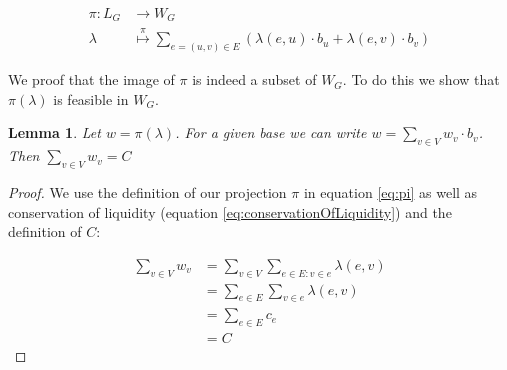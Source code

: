 \documentclass[10pt,twocolumn]{article}
\newtheorem{definition}{Definition}[section]
\newtheorem{lemma}[theorem]{Lemma}
\begin{document}
\begin{equation}
  \begin{split}
  \label{eq:pi}
  \pi: L_G & \longrightarrow {W_G}\\
  \lambda & \stackrel{\pi}{\longmapsto}\sum_{e=(u,v)\in E}\left(\lambda(e,u)\cdot b_u + \lambda(e,v)\cdot b_v\right)
  \end{split}
\end{equation}

We proof that the image of $\pi$ is indeed a subset of $W_G$. To do this we show that $\pi(\lambda)$ is feasible in $W_G$.

\begin{lemma}
Let $w = \pi(\lambda)$. For a given base we can write $w=\sum_{v\in V}w_v\cdot b_v$. Then $\sum_{v\in V}w_v = C$ 
\end{lemma}
\begin{proof}
  We use the definition of our projection $\pi$ in equation \ref{eq:pi} as well as conservation of liquidity (equation \ref{eq:conservationOfLiquidity}) and the definition of $C$:

\begin{equation}
\begin{split}
  \sum_{v\in V}w_v & = \sum_{v\in V}\sum_{e\in E:v \in e}\lambda(e,v) \\
  & = \sum_{e\in E}\sum_{v\in e}\lambda(e,v) \\
  & = \sum_{e\in E} c_{e} \\
  & = C
\end{split}
\end{equation}
\end{proof}


\end{document}
